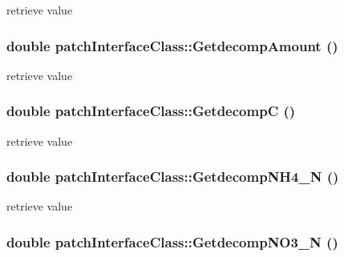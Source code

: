 retrieve value \hypertarget{classpatch_interface_class_acf19842fe4f4e22afeef2f9311f80844}{
\subsubsection[{GetdecompAmount}]{\setlength{\rightskip}{0pt plus 5cm}double patchInterfaceClass::GetdecompAmount ()}}
\label{classpatch_interface_class_acf19842fe4f4e22afeef2f9311f80844}


retrieve value \hypertarget{classpatch_interface_class_a77ece4c3fefc61b3582f209a6972e145}{
\subsubsection[{GetdecompC}]{\setlength{\rightskip}{0pt plus 5cm}double patchInterfaceClass::GetdecompC ()}}
\label{classpatch_interface_class_a77ece4c3fefc61b3582f209a6972e145}


retrieve value \hypertarget{classpatch_interface_class_aa50f7e747e12b3b2aceff2ceacbf0fd6}{
\subsubsection[{GetdecompNH4\_\-N}]{\setlength{\rightskip}{0pt plus 5cm}double patchInterfaceClass::GetdecompNH4\_\-N ()}}
\label{classpatch_interface_class_aa50f7e747e12b3b2aceff2ceacbf0fd6}


retrieve value \hypertarget{classpatch_interface_class_a004f7335353f2dee7762fd7b6eb70d94}{
\subsubsection[{GetdecompNO3\_\-N}]{\setlength{\rightskip}{0pt plus 5cm}double patchInterfaceClass::GetdecompNO3\_\-N ()}}
\label{classpatch_interface_class_a004f7335353f2dee7762fd7b6eb70d94}


